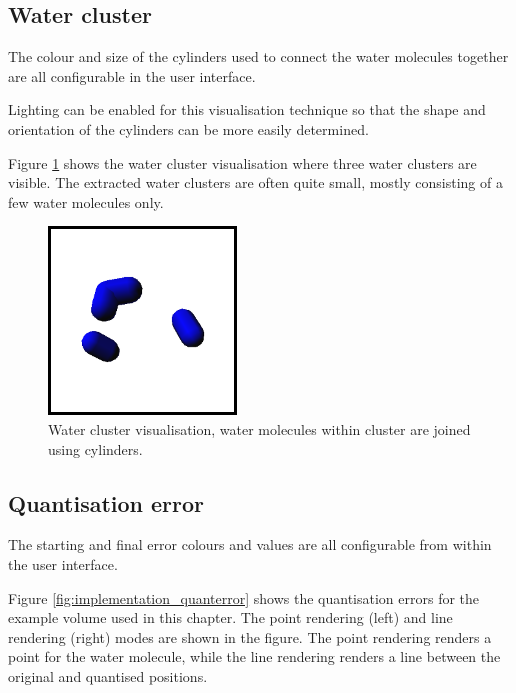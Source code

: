 

\subsection*{Water cluster}

The colour and size of the cylinders used to connect the water molecules
together are all configurable in the user interface.

Lighting can be enabled for this visualisation technique so that the shape and
orientation of the cylinders can be more easily determined.

Figure \ref{fig:implementation_watercluster} shows the water cluster
visualisation where three water clusters are visible. The extracted water
clusters are often quite small, mostly consisting of a few water molecules only.

\begin{figure}
  \begin{center}
    \includegraphics[width=50mm]{watercluster}
  \end{center}
  \caption{Water cluster visualisation, water molecules within cluster are
  joined using cylinders.}
  \label{fig:implementation_watercluster}
\end{figure}


\subsection*{Quantisation error}

The starting and final error colours and values are all configurable from
within the user interface.

Figure \ref{fig:implementation_quanterror} shows the quantisation errors for
the example volume used in this chapter. The point rendering (left) and line
rendering (right) modes are shown in the figure. The point rendering renders a
point for the water molecule, while the line rendering renders a line between
the original and quantised positions.

